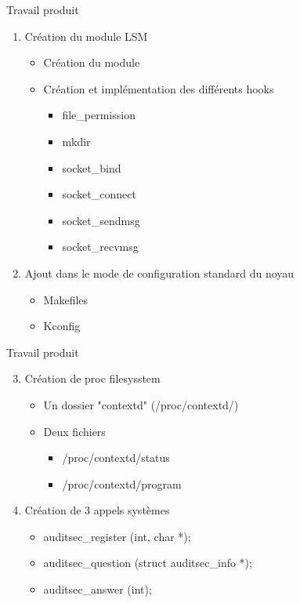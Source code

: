 \documentclass{beamer}
\begin{document}
\begin{frame}{Travail produit}
\begin{enumerate}
	\item Création du module LSM \\
	\begin{itemize}
		\item Création du module
		\item Création et implémentation des différents hooks \\
		\begin{itemize}
			\item file\_permission
			\item mkdir
			\item socket\_bind
			\item socket\_connect
			\item socket\_sendmsg
			\item socket\_recvmsg
		\end{itemize}
	\end{itemize}	
	\item Ajout dans le mode de configuration standard du noyau
		\begin{itemize}
			\item Makefiles
			\item Kconfig
		\end{itemize}
\end{enumerate}
\end{frame}

\begin{frame}{Travail produit}
\begin{enumerate}
\setcounter{enumi}{2}
	\item Création de proc filesysstem \\
	\begin{itemize}
		\item Un dossier "contextd" (/proc/contextd/)
		\item Deux fichiers\
		\begin{itemize}
			\item /proc/contextd/status
			\item /proc/contextd/program
		\end{itemize}
	\end{itemize}
	\item Création de 3 appels systèmes \\
	\begin{itemize}
		\item auditsec\_register (int, char *);
		\item auditsec\_question (struct auditsec\_info *);
		\item auditsec\_answer (int);
	\end{itemize}
\end{enumerate}
\end{frame}
\end{document}
